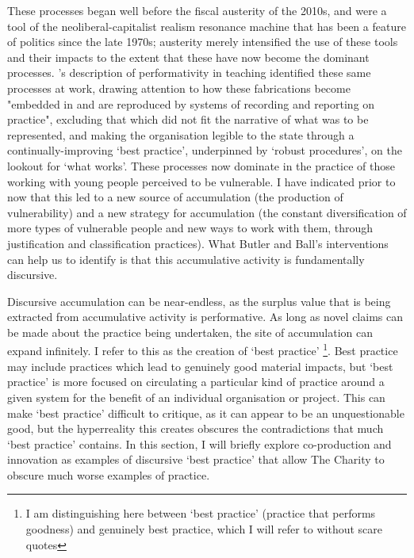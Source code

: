 These processes began well before the fiscal austerity of the 2010s, and were a tool of the neoliberal-capitalist realism resonance machine that has been a feature of politics since the late 1970s; austerity merely intensified the use of these tools and their impacts to the extent that these have now become the dominant processes. \citet[p. 225]{ball_teachers_2003}'s description of performativity in teaching identified these same processes at work, drawing attention to how these fabrications become "embedded in and are reproduced by systems of recording and reporting on practice", excluding that which did not fit the narrative of what was to be represented, and making the organisation legible to the state through a continually-improving `best practice', underpinned by `robust procedures', on the lookout for `what works'. These processes  now dominate in the practice of those working with young people perceived to be vulnerable. I have indicated prior to now that this led to a new source of accumulation (the production of vulnerability) and a new strategy for accumulation (the constant diversification of more types of vulnerable people and new ways to work with them, through justification and classification practices). What Butler and Ball's interventions can help us to identify is that this accumulative activity is fundamentally discursive. 

Discursive accumulation can be near-endless, as the surplus value that is being extracted from accumulative activity is performative. As long as novel claims can be made about the practice being undertaken, the site of accumulation can expand infinitely. I refer to this as the creation of `best practice' \footnote{I am distinguishing here between `best practice' (practice that performs goodness) and genuinely best practice, which I will refer to without scare quotes}. Best practice may include practices which lead to genuinely good material impacts, but `best practice' is more focused on circulating a particular kind of practice around a given system for the benefit of an individual organisation or project. This can make `best practice' difficult to critique, as it can appear to be an unquestionable good, but the hyperreality this creates obscures the contradictions that much `best practice' contains. In this section, I will briefly explore co-production and innovation as examples of discursive `best practice' that allow The Charity to obscure much worse examples of practice.

